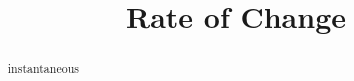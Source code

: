 \documentclass{ximera}
\title{Rate of Change}
\begin{document}
\begin{abstract}
instantaneous
\end{abstract}
\maketitle
\end{document}

